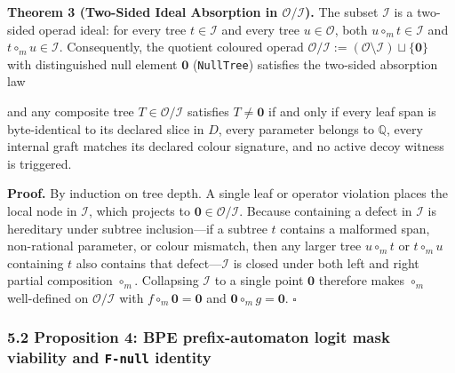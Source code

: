 \documentclass[
  11pt,
]{article}
\newcommand{\passthrough}[1]{#1}
\newcommand{\PfpDisplayMath}[1]{%
  \sbox{\PfpMathBox}{$\displaystyle #1$}%
  \ifdim\wd\PfpMathBox>\linewidth
    \resizebox{\linewidth}{!}{\usebox{\PfpMathBox}}%
  \else\usebox{\PfpMathBox}\fi}
\begin{document}
\textbf{Theorem 3 (Two-Sided Ideal Absorption in
\(\mathcal{O} / \mathcal{I}\)).} The subset \(\mathcal{I}\) is a
two-sided operad ideal: for every tree \(t \in \mathcal{I}\) and every
tree \(u \in \mathcal{O}\), both \(u \circ_m t \in \mathcal{I}\) and
\(t \circ_m u \in \mathcal{I}\). Consequently, the quotient coloured
operad
\(\mathcal{O} / \mathcal{I} := (\mathcal{O} \setminus \mathcal{I}) \sqcup \{\mathbf{0}\}\)
with distinguished null element \(\mathbf{0}\)
(\passthrough{\lstinline!NullTree!}) satisfies the two-sided absorption
law
\begin{center}\PfpDisplayMath{f \circ_m \mathbf{0} = \mathbf{0}, \qquad \mathbf{0} \circ_m g = \mathbf{0},}\end{center}
and any composite tree \(T \in \mathcal{O} / \mathcal{I}\) satisfies
\(T \ne \mathbf{0}\) if and only if every leaf span is byte-identical to
its declared slice in \(D\), every parameter belongs to \(\mathbb{Q}\),
every internal graft matches its declared colour signature, and no
active decoy witness is triggered.

\textbf{Proof.} By induction on tree depth. A single leaf or operator
violation places the local node in \(\mathcal{I}\), which projects to
\(\mathbf{0} \in \mathcal{O} / \mathcal{I}\). Because containing a
defect in \(\mathcal{I}\) is hereditary under subtree inclusion---if a
subtree \(t\) contains a malformed span, non-rational parameter, or
colour mismatch, then any larger tree \(u \circ_m t\) or \(t \circ_m u\)
containing \(t\) also contains that defect---\(\mathcal{I}\) is closed
under both left and right partial composition \(\circ_m\). Collapsing
\(\mathcal{I}\) to a single point \(\mathbf{0}\) therefore makes
\(\circ_m\) well-defined on \(\mathcal{O} / \mathcal{I}\) with
\(f \circ_m \mathbf{0} = \mathbf{0}\) and
\(\mathbf{0} \circ_m g = \mathbf{0}\). \(\square\)

\subsubsection{\texorpdfstring{5.2 Proposition 4: BPE prefix-automaton
logit mask viability and \texttt{F-null}
identity}{5.2 Proposition 4: BPE prefix-automaton logit mask viability and F-null identity}}\label{proposition-4-bpe-prefix-automaton-logit-mask-viability-and-f-null-identity}
\end{document}
